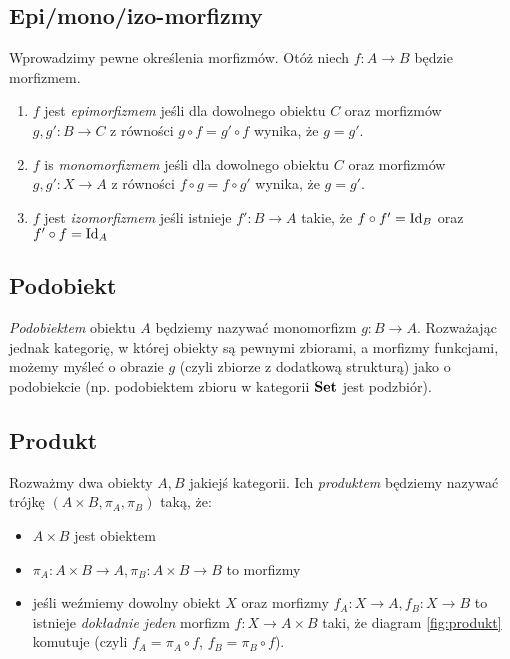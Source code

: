 \subsection{Epi/mono/izo-morfizmy}
Wprowadzimy pewne określenia morfizmów. Otóż niech $f:A\to B$ będzie morfizmem.

\begin{enumerate}
  \item $f$ jest \emph{epimorfizmem} jeśli dla dowolnego obiektu $C$ oraz morfizmów $g, g': B\to C$ z równości $g\circ f= g'\circ f$ wynika, że $g=g'$.
  \item $f$ is \emph{monomorfizmem} jeśli dla dowolnego obiektu $C$ oraz morfizmów $g, g': X\to A$ z równości $f\circ g= f\circ g'$ wynika, że
  $g=g'$.
  \item $f$ jest \emph{izomorfizmem} jeśli istnieje $f':B\to A$ takie, że $f\circ f'=\text{Id}_B$ oraz $f'\circ f=\text{Id}_A$
\end{enumerate}




\subsection{Podobiekt}
\textit{Podobiektem} obiektu $A$ będziemy nazywać monomorfizm $g: B\to A$. Rozważając jednak kategorię, w której obiekty są pewnymi zbiorami, a morfizmy funkcjami, możemy
myśleć o obrazie $g$ (czyli zbiorze z dodatkową strukturą) jako o podobiekcie (np. podobiektem zbioru w kategorii $\textbf{Set}$ jest podzbiór).



\subsection{Produkt}
Rozważmy dwa obiekty $A, B$ jakiejś kategorii. Ich \emph{produktem} będziemy nazywać
trójkę $(A\times B, \pi_A, \pi_B)$ taką, że:
\begin{itemize}
  \item $A\times B$ jest obiektem
  \item $\pi_A: A\times B\to A, \pi_B:A\times B\to B$ to morfizmy
  \item jeśli weźmiemy dowolny obiekt $X$ oraz morfizmy $f_A: X\to A, f_B: X\to B$ to
    istnieje \textit{dokładnie jeden} morfizm $f:X\to A\times B$ taki, że diagram \ref{fig:produkt} komutuje (czyli $f_A=\pi_A\circ f$, $f_B=\pi_B\circ f$).
\end{itemize}


